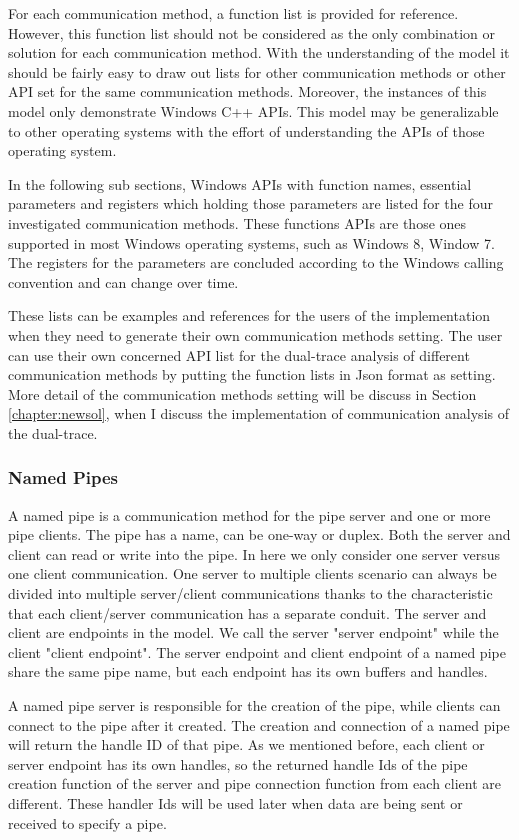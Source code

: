 For each communication method, a function list is provided for reference. However, this function list should not be considered as the only combination or solution for each communication method. With the understanding of the model it should be fairly easy to draw out lists for other communication methods or other API set for the same communication methods. Moreover, the instances of this model only demonstrate Windows C++ APIs. This model may be generalizable to other operating systems with the effort of understanding the APIs of those operating system.

In the following sub sections, Windows APIs with function names, essential parameters and registers which holding those parameters are listed for the four investigated communication methods. These functions APIs are those ones supported in most Windows operating systems, such as Windows 8, Window 7. The registers for the parameters are concluded according to the Windows calling convention and can change over time. 

These lists can be examples and references for the users of the implementation when they need to generate their own communication methods setting. The user can use their own concerned API list for the dual-trace analysis of different communication methods by putting the function lists in Json format as setting. More detail of the communication methods setting will be discuss in Section \ref{chapter:newsol}, when I discuss the implementation of communication analysis of the dual-trace.

\subsubsection{Named Pipes}
A named pipe is a communication method for the pipe server and one or more pipe clients. The pipe has a name, can be one-way or duplex. Both the server and client can read or write into the pipe.\cite{WinNamedpipe} In here we only consider one server versus one client communication. One server to multiple clients scenario can always be divided into multiple server/client communications thanks to the characteristic that each client/server communication has a separate conduit. The server and client are endpoints in the model. We call the server "server endpoint" while the client "client endpoint". The server endpoint and client endpoint of a named pipe share the same pipe name, but each endpoint has its own buffers and handles. 

A named pipe server is responsible for the creation of the pipe, while clients can connect to the pipe after it created. The creation and connection of a named pipe will return the handle ID of that pipe. As we mentioned before, each client or server endpoint has its own handles, so the returned handle Ids of the pipe creation function of the server and pipe connection function from each client are different. These handler Ids will be used later when data are being sent or received to specify a pipe.

